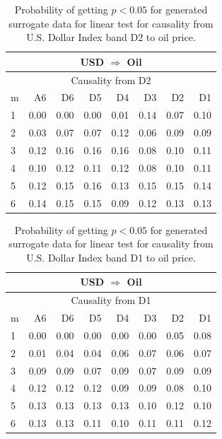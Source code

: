 %
%
\begin{table}[H]
\begin{center}
\begin{tabular}{l|r r r r r r r}
\hline\hline
\multicolumn{8}{c}{USD $\Rightarrow$ Oil}\\
\hline
\multicolumn{8}{c}{Causality from D2}\\
\hline\hline
m & A6 & D6 & D5 & D4 & D3 & D2 & D1 \\
\hline
1 & 0.00 & 0.00 & 0.00 & 0.01 & 0.14 & 0.07 & \cellcolor{mygrey}0.10 \\
2 & 0.03 & 0.07 & 0.07 & \cellcolor{mygrey}0.12 & 0.06 & 0.09 & \cellcolor{mygreen}0.09 \\
3 & 0.12 & 0.16 & \cellcolor{mygrey}0.16 & \cellcolor{mygrey}0.16 & 0.08 & 0.10 & 0.11 \\
4 & 0.10 & 0.12 & 0.11 & 0.12 & 0.08 & 0.10 & 0.11 \\
5 & 0.12 & 0.15 & \cellcolor{mygrey}0.16 & 0.13 & 0.15 & 0.15 & \cellcolor{mygrey}0.14 \\
6 & 0.14 & 0.15 & 0.15 & 0.09 & 0.12 & 0.13 & \cellcolor{mygrey}0.13 \\
\hline\hline
\end{tabular}
\caption{Probability of getting $p < 0.05$ for generated surrogate data for linear test for causality from U.S. Dollar Index band D2 to oil price.}
\end{center}
\end{table}

%
%
\begin{table}[H]
\begin{center}
\begin{tabular}{l|r r r r r r r}
\hline\hline
\multicolumn{8}{c}{USD $\Rightarrow$ Oil}\\
\hline
\multicolumn{8}{c}{Causality from D1}\\
\hline\hline
m & A6 & D6 & D5 & D4 & D3 & D2 & D1 \\
\hline
1 & 0.00 & 0.00 & 0.00 & 0.00 & 0.00 & 0.05 & 0.08 \\
2 & 0.01 & 0.04 & 0.04 & \cellcolor{mygreen}0.06 & 0.07 & 0.06 & 0.07 \\
3 & 0.09 & 0.09 & 0.07 & \cellcolor{mygreen}0.09 & 0.07 & 0.09 & 0.09 \\
4 & \cellcolor{mygrey}0.12 & 0.12 & 0.12 & \cellcolor{mygreen}0.09 & 0.09 & 0.08 & 0.10 \\
5 & \cellcolor{mygrey}0.13 & 0.13 & 0.13 & \cellcolor{mygrey}0.13 & 0.10 & 0.12 & 0.10 \\
6 & \cellcolor{mygrey}0.13 & \cellcolor{mygrey}0.13 & 0.11 & \cellcolor{mygrey}0.10 & 0.11 & 0.11 & 0.12 \\
\hline\hline
\end{tabular}
\caption{Probability of getting $p < 0.05$ for generated surrogate data for linear test for causality from U.S. Dollar Index band D1 to oil price.}
\end{center}
\end{table}

